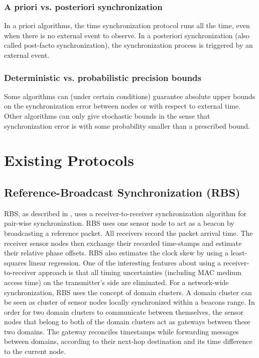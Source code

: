 \subsubsection{A priori vs. posteriori synchronization}
In a priori algorithms, the time synchronization protocol runs all the time, even when there is no external event to observe. In a posteriori synchronization (also called post-facto synchronization), the synchronization process is triggered by an external event.

\subsubsection{Deterministic vs. probabilistic precision bounds}
Some algorithms can (under certain conditions) guarantee absolute upper bounds on the synchronization error between nodes or with respect to external time. Other algorithms can only give stochastic bounds in the sense that synchronization error is with some probability smaller than a prescribed bound.

\setcounter{secnumdepth}{2}
\section{Existing Protocols}
\setcounter{secnumdepth}{3}

\subsection{Reference-Broadcast Synchronization (RBS)}
\ac{RBS}, as described in \cite{Elson02-RBS}, uses a receiver-to-receiver synchronization algorithm for pair-wise synchronization. RBS uses one sensor node to act as a beacon by broadcasting a reference packet. All receivers record the packet arrival time. The receiver sensor nodes then exchange their recorded time-stamps and estimate their relative phase offsets. RBS also estimates the clock skew by using a least-squares linear regression. One of the interesting features about using a receiver-to-receiver approach is that all timing uncertainties (including MAC medium access time) on the transmitter's side are eliminated. For a network-wide synchronization, RBS uses the concept of domain clusters. A domain cluster can be seen as cluster of sensor nodes locally synchronized within a beacons range. In order for two domain clusters to communicate between themselves, the sensor nodes that belong to both of the domain clusters act as gateways between these two domains. The gateway reconciles timestamps while forwarding  messages between domains, according to their next-hop destination and its time difference to the current node.

